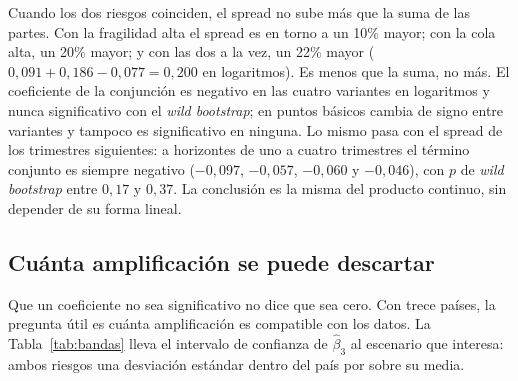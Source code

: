 Cuando los dos riesgos coinciden, el spread no sube más que la suma de las partes. Con la fragilidad alta el spread es en torno a un 10\% mayor; con la cola alta, un 20\% mayor; y con las dos a la vez, un 22\% mayor ($0{,}091+0{,}186-0{,}077=0{,}200$ en logaritmos). Es menos que la suma, no más. El coeficiente de la conjunción es negativo en las cuatro variantes en logaritmos y nunca significativo con el \textit{wild bootstrap}; en puntos básicos cambia de signo entre variantes y tampoco es significativo en ninguna. Lo mismo pasa con el spread de los trimestres siguientes: a horizontes de uno a cuatro trimestres el término conjunto es siempre negativo ($-0{,}097$, $-0{,}057$, $-0{,}060$ y $-0{,}046$), con $p$ de \textit{wild bootstrap} entre $0{,}17$ y $0{,}37$. La conclusión es la misma del producto continuo, sin depender de su forma lineal.

\subsection{Cuánta amplificación se puede descartar}
\label{sec:bandas-aditividad}

Que un coeficiente no sea significativo no dice que sea cero. Con trece países, la pregunta útil es cuánta amplificación es compatible con los datos. La Tabla~\ref{tab:bandas} lleva el intervalo de confianza de $\hat\beta_3$ al escenario que interesa: ambos riesgos una desviación estándar dentro del país por sobre su media.

